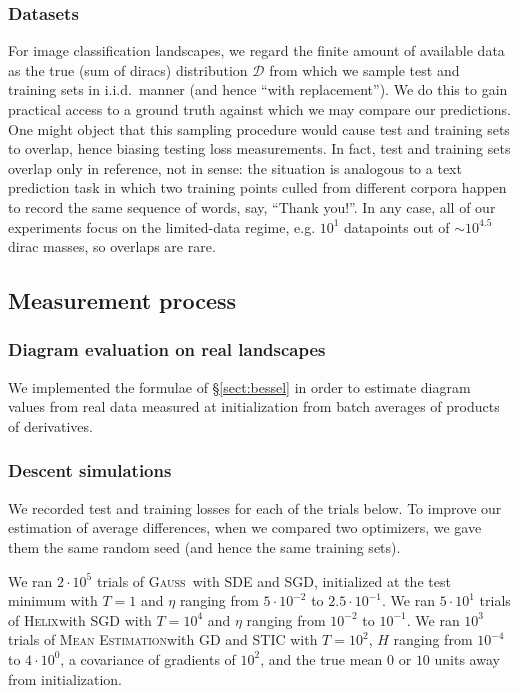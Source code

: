 \documentclass[final,12pt]{colt2021} %
\newcommand{\Dd}{\mathcal{D}}
\newcommand{\Gauss}{\textsc{Gauss}}
\newcommand{\Helix}{\textsc{Helix}}
\newcommand{\MeanEstimation}{\textsc{Mean Estimation}}
\begin{document}
        \subsubsection{Datasets}
            For image classification landscapes, we regard the finite amount of
            available data as the true (sum of diracs) distribution $\Dd$ from
            which we sample test and training sets in i.i.d.\ manner (and hence
            ``with replacement'').  We do this to gain practical access to a
            ground truth against which we may compare our predictions.  One
            might object that this sampling procedure would cause test and
            training sets to overlap, hence biasing testing loss measurements.  In
            fact, test and training sets overlap only in reference, not in
            sense: the situation is analogous to a text prediction task in
            which two training points culled from different corpora happen to
            record the same sequence of words, say, ``Thank you!''.  In any
            case, all of our experiments focus on the limited-data regime, e.g.
            $10^1$ datapoints out of $\sim 10^{4.5}$ dirac masses, so overlaps
            are rare.

    \subsection{Measurement process}                                \label{appendix:measure}

        \subsubsection{Diagram evaluation on real landscapes}
            We implemented the formulae of \S\ref{sect:bessel} in order
            to estimate diagram values from real data measured at
            initialization from batch averages of products of derivatives.

        \subsubsection{Descent simulations}
            We recorded test and training losses for each of the trials below.  To
            improve our estimation of average differences, when we compared two
            optimizers, we gave them the same random seed (and hence the same
            training sets).

            We ran $2 \cdot 10^5$ trials of \Gauss\, with SDE and SGD,
            initialized at the test minimum with $T=1$ and $\eta$ ranging from
            $5\cdot 10^{-2}$ to $2.5\cdot 10^{-1}$.
            We ran $5 \cdot 10^1$ trials of \Helix with SGD with $T=10^4$
            and $\eta$ ranging from $10^{-2}$ to $10^{-1}$.
            We ran $10^3$ trials of \MeanEstimation with GD and STIC
            with $T=10^2$, $H$ ranging from $10^{-4}$ to $4 \cdot 10^0$,
            a covariance of gradients of $10^2$, and the true mean $0$ or
            $10$ units away from initialization.
\end{document}
